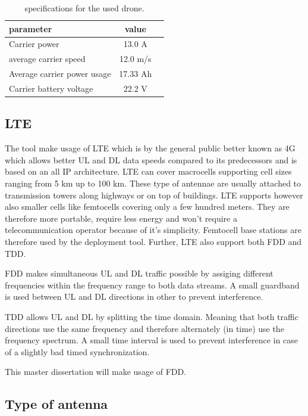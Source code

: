 \begin{table}[h!]
\centering
\begin{tabular}{|l|c|l|}
\hline
 parameter          & value         \\    \hline
 Carrier power      & 13.0 A \\
 average carrier speed           & 12.0 m/s       \\ 
 Average carrier power usage    & 17.33 Ah      \\ 
 Carrier battery voltage        & 22.2 V \\ \hline
\end{tabular}
\caption{specifications for the used drone.}
\label{table:dronespecs}
\end{table}

\subsection{LTE}
The tool make usage of \gls{LTE} which is by the general public better known as 4G which allows better \gls{UL} and \gls{DL} data speeds 
compared to its predecessors and is based on an all IP architecture. LTE can cover macrocells supporting cell sizes ranging from 5 km up to 100 km. 
These type of antennae are usually attached to transmission towers along highways or on top of buildings. LTE supports however also smaller cells like
femtocells covering only a few hundred meters. They are therefore more portable, require less energy and won't require a telecommunication operator because
of it's simplicity. Femtocell base stations are therefore used by the deployment tool.
Further, \gls{LTE} also support both \gls{FDD} and \gls{TDD}.

\gls{FDD} makes simultaneous \gls{UL} and \gls{DL} traffic possible by assiging different frequencies within the frequency range 
to both data streams. A small guardband is used between \gls{UL} and \gls{DL} directions in other to prevent interference.

\gls{TDD} allows  \gls{UL} and \gls{DL} by splitting the time domain. Meaning that both traffic directions use the same frequency and therefore
alternately (in time) use the frequency spectrum. A small time interval is used to prevent interference in case of a slightly bad timed synchronization.

This master dissertation will make usage of \gls{FDD}.

\subsection{Type of antenna} %

